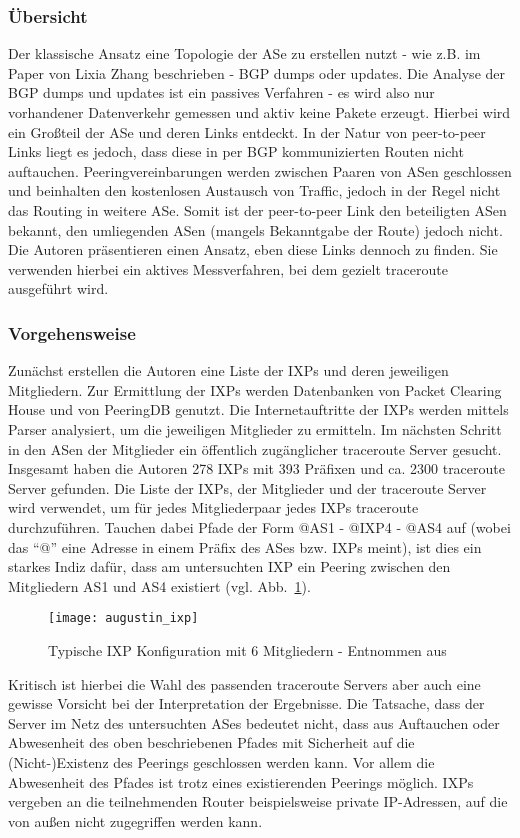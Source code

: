 \subsubsection{Übersicht}
Der klassische Ansatz eine Topologie der ASe zu erstellen nutzt - wie z.B. im Paper von Lixia Zhang beschrieben - BGP dumps oder updates.
Die Analyse der BGP dumps und updates ist ein passives Verfahren - es wird also nur vorhandener Datenverkehr gemessen und aktiv keine Pakete erzeugt.
Hierbei wird ein Großteil der ASe und deren Links entdeckt.
In der Natur von peer-to-peer Links liegt es jedoch, dass diese in per BGP kommunizierten Routen nicht auftauchen.
Peeringvereinbarungen werden zwischen Paaren von ASen geschlossen und beinhalten den kostenlosen Austausch von Traffic, jedoch in der Regel nicht das Routing in weitere ASe.
Somit ist der peer-to-peer Link den beteiligten ASen bekannt, den umliegenden ASen (mangels Bekanntgabe der Route) jedoch nicht.
Die Autoren präsentieren einen Ansatz, eben diese Links dennoch zu finden.
Sie verwenden hierbei ein aktives Messverfahren, bei dem gezielt traceroute ausgeführt wird.

\subsubsection{Vorgehensweise}
Zunächst erstellen die Autoren eine Liste der IXPs und deren jeweiligen Mitgliedern.
Zur Ermittlung der IXPs werden Datenbanken von Packet Clearing House und von PeeringDB genutzt.
Die Internetauftritte der IXPs werden mittels Parser analysiert, um die jeweiligen Mitglieder zu ermitteln.
Im nächsten Schritt in den ASen der Mitglieder ein öffentlich zugänglicher traceroute Server gesucht.
Insgesamt haben die Autoren 278 IXPs mit 393 Präfixen und ca. 2300 traceroute Server gefunden.
Die Liste der IXPs, der Mitglieder und der traceroute Server wird verwendet, um für jedes Mitgliederpaar jedes IXPs traceroute durchzuführen.
Tauchen dabei Pfade der Form @AS1 - @IXP4 - @AS4 auf (wobei das "`@"' eine Adresse in einem Präfix des ASes bzw. IXPs meint), ist dies ein starkes Indiz dafür, dass am untersuchten IXP ein Peering zwischen den Mitgliedern AS1 und AS4 existiert (vgl. Abb.~\ref{fig:augustin_ixp}).
\begin{figure}
  \begin{center}
    \texttt{[image: augustin\_ixp]}
    \caption{Typische IXP Konfiguration mit 6 Mitgliedern - Entnommen aus~\cite{Augustin:2009:IM:1644893.1644934}}
    \label{fig:augustin_ixp}
  \end{center}
\end{figure}
Kritisch ist hierbei die Wahl des passenden traceroute Servers aber auch eine gewisse Vorsicht bei der Interpretation der Ergebnisse.
Die Tatsache, dass der Server im Netz des untersuchten ASes bedeutet nicht, dass aus Auftauchen oder Abwesenheit des oben beschriebenen Pfades mit Sicherheit auf die (Nicht-)Existenz des Peerings geschlossen werden kann.
Vor allem die Abwesenheit des Pfades ist trotz eines existierenden Peerings möglich.
IXPs vergeben an die teilnehmenden Router beispielsweise private IP-Adressen, auf die von außen nicht zugegriffen werden kann.

